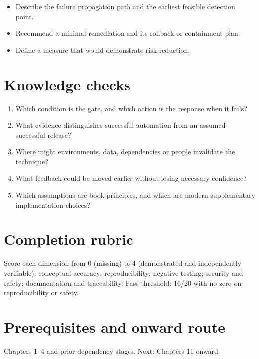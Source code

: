 \documentclass[10pt,letterpaper]{article}
\begin{document}
\begin{itemize}
\item Describe the failure propagation path and the earliest feasible detection point.
\item Recommend a minimal remediation and its rollback or containment plan.
\item Define a measure that would demonstrate risk reduction.
\end{itemize}

\section{Knowledge checks}
\begin{enumerate}
\item Which condition is the gate, and which action is the response when it fails?
\item What evidence distinguishes successful automation from an assumed successful release?
\item Where might environments, data, dependencies or people invalidate the technique?
\item What feedback could be moved earlier without losing necessary confidence?
\item Which assumptions are book principles, and which are modern supplementary implementation choices?
\end{enumerate}

\section{Completion rubric}
Score each dimension from 0 (missing) to 4 (demonstrated and independently verifiable): conceptual accuracy; reproducibility; negative testing; security and safety; documentation and traceability. Pass threshold: 16/20 with no zero on reproducibility or safety.


\section{Prerequisites and onward route}
Chapters 1--4 and prior dependency stages. Next: Chapters 11 onward.
\end{document}
